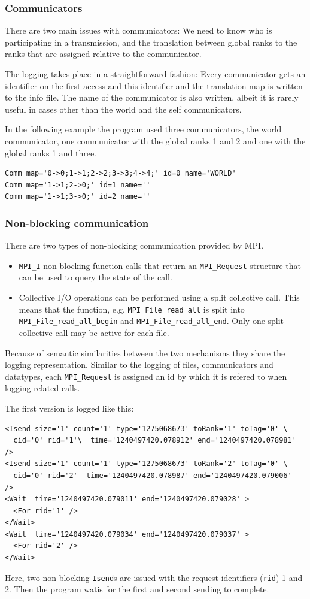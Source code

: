 \documentclass[a4paper,12pt,pdftex]{scrartcl}
\begin{document}
\subsubsection{Communicators}
There are two main issues with communicators: We need to know who is
participating in a transmission, and the translation between global
ranks to the ranks that are assigned relative to the communicator.

The logging takes place in a straightforward fashion: Every
communicator gets an identifier on the first access and this
identifier and the translation map is written to the info file.
The name of the communicator is also written, albeit it is rarely
useful in cases other than the world and the self communicators.

In the following example the program used three communicators, the
world communicator, one communicator with the global ranks 1 and 2 and
one with the global ranks 1 and three.
\begin{lstlisting}
Comm map='0->0;1->1;2->2;3->3;4->4;' id=0 name='WORLD'
Comm map='1->1;2->0;' id=1 name=''
Comm map='1->1;3->0;' id=2 name=''
\end{lstlisting}

\subsubsection{Non-blocking communication}

There are two types of non-blocking communication provided by MPI.
\begin{itemize}
\item \verb/MPI_I/ non-blocking function calls that return an
  \verb/MPI_Request/ structure that can be used to query the state of
  the call.
\item Collective I/O operations can be performed using a split
  collective call. This means that the function,
  e.g. \verb/MPI_File_read_all/ is split into
  \verb/MPI_File_read_all_begin/ and \verb/MPI_File_read_all_end/.
  Only one split collective call may be active for each file.
\end{itemize}

Because of semantic similarities between the two mechanisms they share
the logging representation. Similar to the logging of files,
communicators and datatypes, each \verb/MPI_Request/ is assigned an id
by which it is refered to when logging related calls. 

The first version is logged like this:
\begin{lstlisting}
<Isend size='1' count='1' type='1275068673' toRank='1' toTag='0' \
  cid='0' rid='1'\  time='1240497420.078912' end='1240497420.078981'  />
<Isend size='1' count='1' type='1275068673' toRank='2' toTag='0' \
  cid='0' rid='2'  time='1240497420.078987' end='1240497420.079006'  />
<Wait  time='1240497420.079011' end='1240497420.079028' >
  <For rid='1' />
</Wait>
<Wait  time='1240497420.079034' end='1240497420.079037' >
  <For rid='2' />
</Wait>
\end{lstlisting}
Here, two non-blocking \verb/Isend/s are issued with the request
identifiers (\verb/rid/) 1 and 2. Then the program watis for the first
and second sending to complete.
\end{document}
